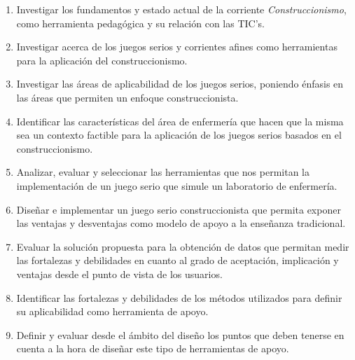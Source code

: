 \begin{enumerate}
    \item Investigar los fundamentos y estado actual de la corriente
        \emph{Construccionismo}, como herramienta pedagógica y su relación con
        las TIC's.

    \item Investigar acerca de los juegos serios y corrientes afines como
        herramientas para la aplicación del construccionismo.
    
    \item Investigar las áreas de aplicabilidad de los juegos serios, poniendo
        énfasis en las áreas que permiten un enfoque construccionista.
        
    \item Identificar las características del área de enfermería que hacen que
        la misma sea un contexto factible para la aplicación de los juegos
        serios basados en el construccionismo.
    
    \item Analizar, evaluar y seleccionar las herramientas que nos permitan la
        implementación de un juego serio que simule un laboratorio de
        enfermería.
        
    \item Diseñar e implementar un juego serio construccionista que permita
        exponer las ventajas y desventajas como modelo de apoyo a la enseñanza
        tradicional. 

    
    \item Evaluar la solución propuesta para la obtención de datos que permitan
        medir las fortalezas y debilidades en cuanto al grado de aceptación,
        implicación y ventajas desde el punto de vista de los usuarios.

    \item Identificar las fortalezas y debilidades de los métodos utilizados
        para definir su aplicabilidad como herramienta de apoyo. 

    \item Definir y evaluar desde el ámbito del diseño los puntos que deben
        tenerse en cuenta a la hora de diseñar este tipo de herramientas de
        apoyo.

\end{enumerate}


